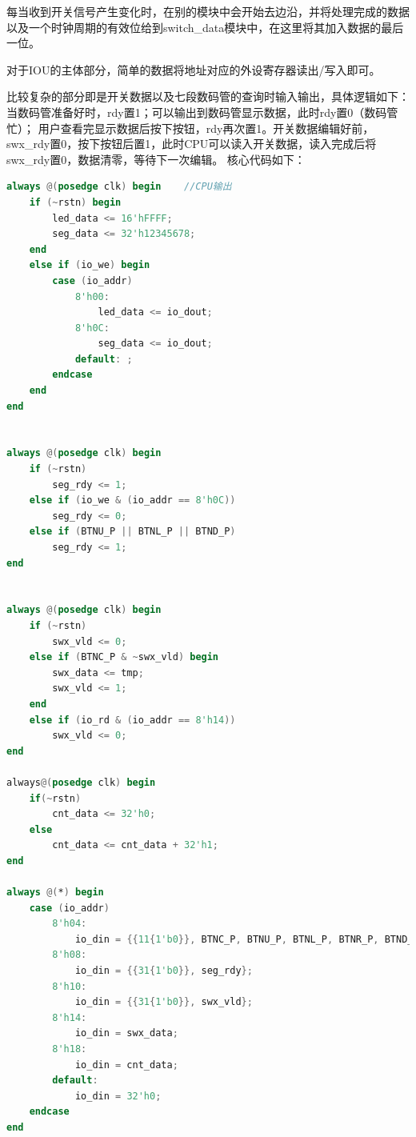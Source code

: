 \documentclass[a4paper]{article}
\begin{document}
每当收到开关信号产生变化时，在别的模块中会开始去边沿，并将处理完成的数据以及一个时钟周期的有效位给到switch\_data模块中，在这里将其加入数据的最后一位。

对于IOU的主体部分，简单的数据将地址对应的外设寄存器读出/写入即可。

比较复杂的部分即是开关数据以及七段数码管的查询时输入输出，具体逻辑如下：当数码管准备好时，rdy置1；可以输出到数码管显示数据，此时rdy置0（数码管忙）；
用户查看完显示数据后按下按钮，rdy再次置1。开关数据编辑好前，swx\_rdy置0，按下按钮后置1，此时CPU可以读入开关数据，读入完成后将swx\_rdy置0，数据清零，等待下一次编辑。
核心代码如下：
\begin{lstlisting}[language={verilog},title={IOU.v}] 
    always @(posedge clk) begin    //CPU输出
    if (~rstn) begin
        led_data <= 16'hFFFF;
        seg_data <= 32'h12345678;
    end
    else if (io_we) begin
        case (io_addr)
            8'h00:
                led_data <= io_dout;
            8'h0C:
                seg_data <= io_dout;
            default: ;
        endcase
    end
end


always @(posedge clk) begin
    if (~rstn)
        seg_rdy <= 1;
    else if (io_we & (io_addr == 8'h0C))
        seg_rdy <= 0;
    else if (BTNU_P || BTNL_P || BTND_P)
        seg_rdy <= 1;
end


always @(posedge clk) begin
    if (~rstn)
        swx_vld <= 0;
    else if (BTNC_P & ~swx_vld) begin
        swx_data <= tmp;
        swx_vld <= 1;
    end
    else if (io_rd & (io_addr == 8'h14))
        swx_vld <= 0;
end

always@(posedge clk) begin
    if(~rstn)
        cnt_data <= 32'h0;
    else
        cnt_data <= cnt_data + 32'h1;
end

always @(*) begin  
    case (io_addr)
        8'h04:
            io_din = {{11{1'b0}}, BTNC_P, BTNU_P, BTNL_P, BTNR_P, BTND_P, sw};
        8'h08:
            io_din = {{31{1'b0}}, seg_rdy};
        8'h10:
            io_din = {{31{1'b0}}, swx_vld};
        8'h14:
            io_din = swx_data;
        8'h18:
            io_din = cnt_data;
        default:
            io_din = 32'h0;
    endcase
end
\end{lstlisting}
\end{document}
